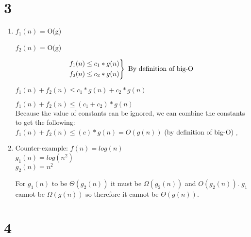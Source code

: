 \documentclass[10pt,a4paper]{report}
\begin{document}
	
	\newpage
	\section*{3}
	\begin{enumerate}[label=(\alph*)]
		\item 
		$f_1(n)$ = O(g)
		
		$f_2(n)$ = O(g)
		
		\begin{equation*}
		\begin{rcases}
		f_1(n) \le c_1 * g(n) \\
		f_2(n) \le c_2 * g(n)
		\end{rcases}
		\text{ By definition of big-O }
		\end{equation*}
		
		$f_1(n) + f_2(n) \le c_1 * g(n) + c_2 * g(n)$
		
		$f_1(n) + f_2(n) \le (c_1 + c_2) * g(n)$
		\\
		
		Because the value of constants can be ignored, we can combine the constants to get the following:
		\\
		
		$f_1(n) + f_2(n) \le (c) * g(n) = O(g(n))$ (by definition of big-O) $_\square$
		\\
		
		\item
		Counter-example:
		$f(n) = log(n)$\\
		$g_1(n) = log(n^2)$\\
		$g_2(n) = n^2$
		
		For $g_1(n)$ to be $\Theta(g_2(n))$ it must be $\Omega(g_2(n))$ and $O(g_2(n))$. $g_1$ cannot be $\Omega(g(n))$ so therefore it cannot be $\Theta(g(n))$.

		
		
	\end{enumerate}

	
	\section*{4}
	
	
\end{document}
